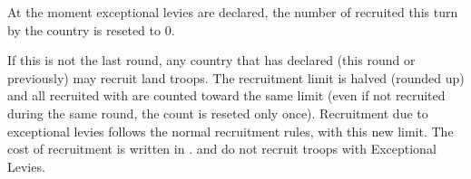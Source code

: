 \aparag At the moment exceptional levies are declared, the number of \LD
recruited this turn by the country is reseted to 0.

\bparag If this is not the last round, any country that has declared
 (this round or previously) may recruit land troops.
\bparag The recruitment limit is halved (rounded up) and all \LD recruited
with  are counted toward the same limit (even if not
recruited during the same round, the count is reseted only once).
\bparag Recruitment due to exceptional levies follows the normal recruitment
rules, with this new limit.
\bparag The cost of recruitment is written in .
\bparag \SUE and \PRU do not recruit  troops with Exceptional
Levies.

